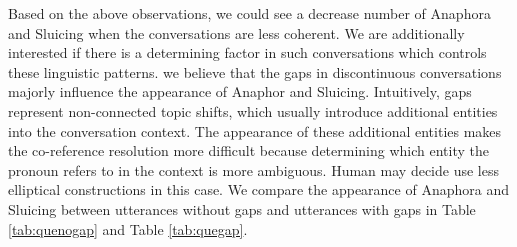 \documentclass[bsc,frontabs,twoside,singlespacing,parskip,deptreport]{infthesis}     %
\begin{document}
Based on the above observations, we could see a decrease number of Anaphora and Sluicing when the conversations are less coherent. We are additionally interested if there is a determining factor in such conversations which controls these linguistic patterns. we believe that the gaps in discontinuous conversations majorly influence the appearance of Anaphor and Sluicing. Intuitively, gaps represent non-connected topic shifts, which usually introduce additional entities into the conversation context. The appearance of these additional entities makes the co-reference resolution more difficult because determining which entity the pronoun refers to in the context is more ambiguous. Human may decide use less elliptical constructions in this case. We compare the appearance of Anaphora and Sluicing between utterances without gaps and utterances with gaps in Table \ref{tab:quenogap} and Table \ref{tab:quegap}.
\end{document}
